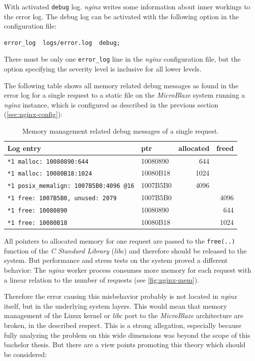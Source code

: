 With activated \texttt{debug} log. \textit{nginx} writes some information about inner workings to the error log. The debug log can be activated with the following option in the configuration file:

\begin{verbatim}
error_log  logs/error.log  debug;
\end{verbatim}

There must be only one \texttt{error\_log} line in the \textit{nginx} configuration file, but the option specifying the severity level is inclusive for all lower levels.

The following table shows all memory related debug messages as found in the error log for a single request to a static file on the \textit{MicroBlaze} system running a \textit{nginx} instance, which is configured as described in the previous section (\ref{sec:nginx-config}):

\begin{table}[H]
\centering
\begin{tabular}{|l|l|r|r|}
    \hline
     \textbf{Log entry} & \textbf{ptr} & \textbf{allocated} & \textbf{freed} \\
    \hline \hline
\texttt{*1 malloc: 10080890:644} & 10080890 & 644 &  \\ \hline
\texttt{*1 malloc: 10080B18:1024} & 10080B18 & 1024 &  \\ \hline
\texttt{*1 posix\_memalign: 1007B5B0:4096 @16} & 1007B5B0 & 4096 &  \\ \hline \hline
\texttt{*1 free: 1007B5B0, unused: 2079} & 1007B5B0 & & 4096 \\ \hline
\texttt{*1 free: 10080890} & 10080890 & & 644 \\ \hline
\texttt{*1 free: 10080B18} & 10080B18 & & 1024 \\ \hline
\end{tabular}
\caption{Memory management related debug messages of a single request.}
\label{tab:debug_mem}
\end{table}

All pointers to allocated memory for one request are passed to the \texttt{free(..)} function of the \textit{C Standard Library} (\textit{libc}) and therefore should be released to the system. But performance and stress tests on the system proved a different behavior: The \textit{nginx} worker process consumes more memory for each request with a linear relation to the number of requests (see \ref{fig:nginx-mem}).

Therefore the error causing this misbehavior probably is not located in \textit{nginx} itself, but in the underlying system layers. This would mean that memory management of the Linux kernel or \textit{libc} port to the \textit{MicroBlaze} architecture are broken, in the described respect. This is a strong allegation, especially because fully analyzing the problem on this wide dimensions was beyond the scope of this bachelor thesis. But there are a view points promoting this theory which should be considered:

